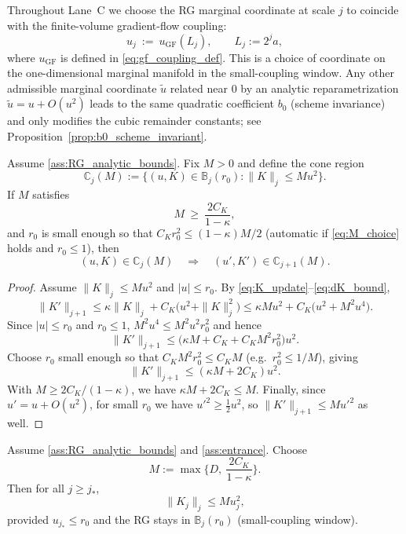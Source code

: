 \begin{proposition}
\label{ass:coord_match}
Throughout Lane~C we choose the RG marginal coordinate at scale $j$ to coincide with the finite-volume
gradient-flow coupling:
\[
u_j \ :=\ u_{\mathrm{GF}}(L_j),\qquad L_j:=2^j a,
\]
where $u_{\mathrm{GF}}$ is defined in \eqref{eq:gf_coupling_def}.
This is a choice of coordinate on the one-dimensional marginal manifold in the small-coupling window.
Any other admissible marginal coordinate $\tilde u$ related near $0$ by an analytic reparametrization
$\tilde u=u+O(u^2)$ leads to the same quadratic coefficient $b_0$ (scheme invariance) and only modifies the cubic remainder
constants; see Proposition~\ref{prop:b0_scheme_invariant}.
\end{proposition}

\begin{lemma}\label{lem:K_invariant}
Assume \ref{ass:RG_analytic_bounds}. Fix $M>0$ and define the cone region
\[
\mathbb C_j(M):=\{(u,K)\in\mathbb B_j(r_0): \|K\|_j\le M u^2\}.
\]
If $M$ satisfies
\begin{equation}\label{eq:M_choice}
M\ \ge\ \frac{2C_K}{1-\kappa},
\end{equation}
and $r_0$ is small enough so that $C_K r_0^2\le (1-\kappa)M/2$ (automatic if \eqref{eq:M_choice} holds and $r_0\le 1$),
then
\[
(u,K)\in\mathbb C_j(M)\quad\Longrightarrow\quad (u',K')\in\mathbb C_{j+1}(M).
\]
\end{lemma}

\begin{proof}
Assume $\|K\|_j\le M u^2$ and $|u|\le r_0$. By \eqref{eq:K_update}--\eqref{eq:dK_bound},
\[
\|K'\|_{j+1}\le \kappa \|K\|_j + C_K\big(u^2+\|K\|_j^2\big)
\le \kappa M u^2 + C_K\big(u^2+M^2 u^4\big).
\]
Since $|u|\le r_0$ and $r_0\le 1$, $M^2 u^4\le M^2 u^2 r_0^2$ and hence
\[
\|K'\|_{j+1}\le \big(\kappa M + C_K + C_K M^2 r_0^2\big)u^2.
\]
Choose $r_0$ small enough so that $C_K M^2 r_0^2\le C_K M$ (e.g.\ $r_0^2\le 1/M$), giving
\[
\|K'\|_{j+1}\le (\kappa M + 2C_K)u^2.
\]
With $M\ge 2C_K/(1-\kappa)$, we have $\kappa M + 2C_K\le M$.
Finally, since $u'=u+O(u^2)$, for small $r_0$ we have $u'^2\ge \tfrac12 u^2$, so $\|K'\|_{j+1}\le M u'^2$ as well.
\end{proof}

\begin{corollary}\label{cor:K_uniform}
Assume \ref{ass:RG_analytic_bounds} and \ref{ass:entrance}. Choose
\[
M:=\max\Big\{D,\ \frac{2C_K}{1-\kappa}\Big\}.
\]
Then for all $j\ge j_\ast$,
\[
\|K_j\|_j\le M u_j^2,
\]
provided $u_{j_\ast}\le r_0$ and the RG stays in $\mathbb B_j(r_0)$ (small-coupling window).
\end{corollary}

